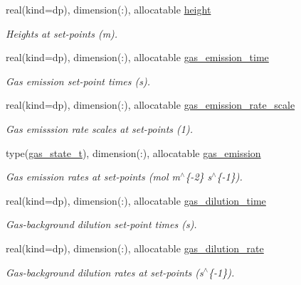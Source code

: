 \begin{DoxyCompactItemize}
real(kind=dp), dimension(\+:), allocatable \mbox{\hyperlink{structpmc__scenario_1_1scenario__t_a6035c8785df2c13a9242910c08116847}{height}}
\begin{DoxyCompactList}\small\item\em Heights at set-\/points (m). \end{DoxyCompactList}\item 
real(kind=dp), dimension(\+:), allocatable \mbox{\hyperlink{structpmc__scenario_1_1scenario__t_ab1e9b58fcd78362fab28bd8b875e6c9c}{gas\+\_\+emission\+\_\+time}}
\begin{DoxyCompactList}\small\item\em Gas emission set-\/point times (s). \end{DoxyCompactList}\item 
real(kind=dp), dimension(\+:), allocatable \mbox{\hyperlink{structpmc__scenario_1_1scenario__t_a789ee28e6039ccd9ddc28da4bcdfae3c}{gas\+\_\+emission\+\_\+rate\+\_\+scale}}
\begin{DoxyCompactList}\small\item\em Gas emisssion rate scales at set-\/points (1). \end{DoxyCompactList}\item 
type(\mbox{\hyperlink{structpmc__gas__state_1_1gas__state__t}{gas\+\_\+state\+\_\+t}}), dimension(\+:), allocatable \mbox{\hyperlink{structpmc__scenario_1_1scenario__t_ada938f752f5f72ed18c83f180233d577}{gas\+\_\+emission}}
\begin{DoxyCompactList}\small\item\em Gas emission rates at set-\/points (mol m$^\wedge$\{-\/2\} s$^\wedge$\{-\/1\}). \end{DoxyCompactList}\item 
real(kind=dp), dimension(\+:), allocatable \mbox{\hyperlink{structpmc__scenario_1_1scenario__t_a5640f4cc94e0bf578a5abf78c95fd494}{gas\+\_\+dilution\+\_\+time}}
\begin{DoxyCompactList}\small\item\em Gas-\/background dilution set-\/point times (s). \end{DoxyCompactList}\item 
real(kind=dp), dimension(\+:), allocatable \mbox{\hyperlink{structpmc__scenario_1_1scenario__t_a889079511bbc62f234a7c4ba9e9fc02b}{gas\+\_\+dilution\+\_\+rate}}
\begin{DoxyCompactList}\small\item\em Gas-\/background dilution rates at set-\/points (s$^\wedge$\{-\/1\}). \end{DoxyCompactList}\item 

\end{DoxyCompactItemize}
